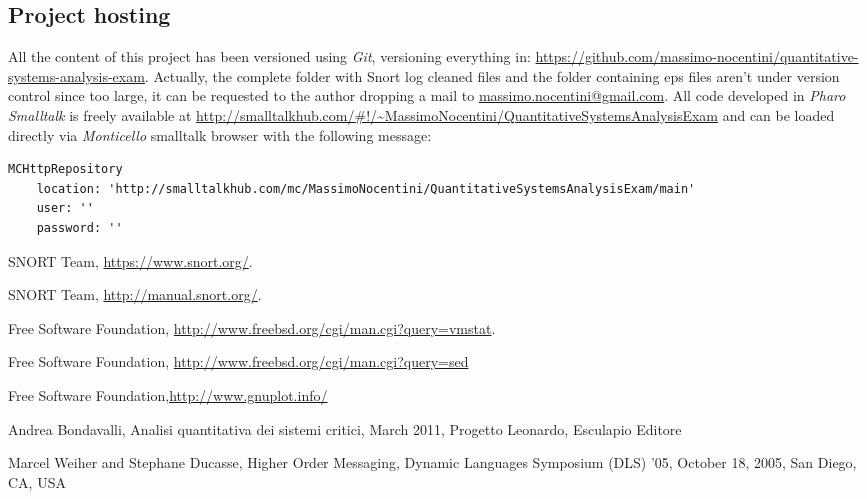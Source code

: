 \documentclass[10pt,a4paper]{article}
\begin{document}
    \subsection{Project hosting}
    All the content of this project has been versioned using
    \emph{Git}, versioning everything in:
    \url{https://github.com/massimo-nocentini/quantitative-systems-analysis-exam}. Actually,
    the complete folder with Snort log cleaned files and the folder
    containing eps files aren't under version control since too large,
    it can be requested to the author dropping a mail to
    \url{massimo.nocentini@gmail.com}. All code developed in
    \emph{Pharo Smalltalk} is freely available at
    \url{http://smalltalkhub.com/#!/~MassimoNocentini/QuantitativeSystemsAnalysisExam} and can be loaded directly via \emph{Monticello} smalltalk browser with the following message:
      \begin{adjustwidth}{-2cm}{}
\begin{verbatim}
MCHttpRepository
	location: 'http://smalltalkhub.com/mc/MassimoNocentini/QuantitativeSystemsAnalysisExam/main'
	user: ''
	password: ''
\end{verbatim}
      \end{adjustwidth}    

    \begin{thebibliography}{9}

      SNORT Team,
      \url{https://www.snort.org/}.

      SNORT Team,
      \url{http://manual.snort.org/}.

      Free Software Foundation,
      \url{http://www.freebsd.org/cgi/man.cgi?query=vmstat}.

      Free Software Foundation,
      \url{http://www.freebsd.org/cgi/man.cgi?query=sed}

     Free Software
      Foundation,\url{http://www.gnuplot.info/}

     Andrea Bondavalli, Analisi quantitativa dei
      sistemi critici, March 2011, Progetto Leonardo, Esculapio
      Editore

     Marcel Weiher and Stephane Ducasse,
      Higher Order Messaging, Dynamic Languages Symposium (DLS) '05,
      October 18, 2005, San Diego, CA, USA


    \end{thebibliography}
\end{document}
